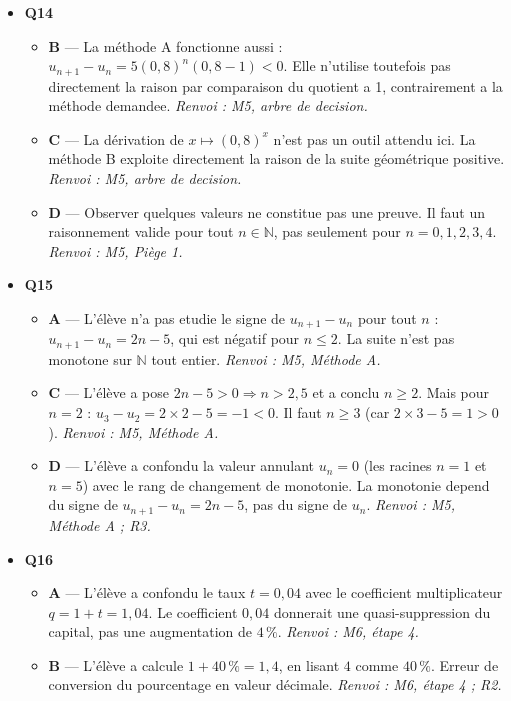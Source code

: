 \begin{itemize}
\begin{itemize}
  \end{itemize}
  \item \textbf{Q14}
  \begin{itemize}
    \item \textbf{B} — La méthode A fonctionne aussi : $u_{n+1}-u_n=5(0{,}8)^n(0{,}8-1)<0$. Elle n'utilise toutefois pas directement la raison par comparaison du quotient a 1, contrairement a la méthode demandee. \emph{Renvoi : M5, arbre de decision.}
    \item \textbf{C} — La dérivation de $x\mapsto(0{,}8)^x$ n'est pas un outil attendu ici. La méthode B exploite directement la raison de la suite géométrique positive. \emph{Renvoi : M5, arbre de decision.}
    \item \textbf{D} — Observer quelques valeurs ne constitue pas une preuve. Il faut un raisonnement valide pour tout $n \in \mathbb{N}$, pas seulement pour $n = 0, 1, 2, 3, 4$. \emph{Renvoi : M5, Piège 1.}
  \end{itemize}
  \item \textbf{Q15}
  \begin{itemize}
    \item \textbf{A} — L'élève n'a pas etudie le signe de $u_{n+1} - u_n$ pour tout $n$ : $u_{n+1} - u_n = 2n - 5$, qui est négatif pour $n \leq 2$. La suite n'est pas monotone sur $\mathbb{N}$ tout entier. \emph{Renvoi : M5, Méthode A.}
    \item \textbf{C} — L'élève a pose $2n - 5 > 0 \Rightarrow n > 2{,}5$ et a conclu $n \geq 2$. Mais pour $n = 2$ : $u_3 - u_2 = 2 \times 2 - 5 = -1 < 0$. Il faut $n \geq 3$ (car $2 \times 3 - 5 = 1 > 0$). \emph{Renvoi : M5, Méthode A.}
    \item \textbf{D} — L'élève a confondu la valeur annulant $u_n = 0$ (les racines $n = 1$ et $n = 5$) avec le rang de changement de monotonie. La monotonie depend du signe de $u_{n+1} - u_n = 2n - 5$, pas du signe de $u_n$. \emph{Renvoi : M5, Méthode A ; R3.}
  \end{itemize}
  \item \textbf{Q16}
  \begin{itemize}
    \item \textbf{A} — L'élève a confondu le taux $t = 0{,}04$ avec le coefficient multiplicateur $q = 1 + t = 1{,}04$. Le coefficient $0{,}04$ donnerait une quasi-suppression du capital, pas une augmentation de $4\,\%$. \emph{Renvoi : M6, étape 4.}
    \item \textbf{B} — L'élève a calcule $1 + 40\,\% = 1{,}4$, en lisant $4$ comme $40\,\%$. Erreur de conversion du pourcentage en valeur décimale. \emph{Renvoi : M6, étape 4 ; R2.}

\end{itemize}
\end{itemize}
